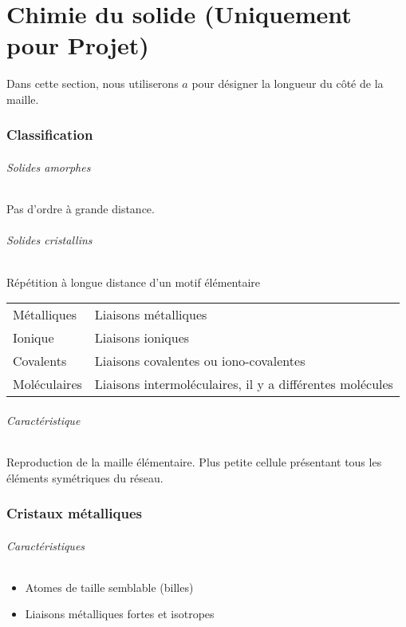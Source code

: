 \part{Chimie du solide (Uniquement pour Projet)}
Dans cette section,
nous utiliserons $a$ pour désigner la longueur du côté de la maille.

\section{Classification}

\paragraph{Solides amorphes}
Pas d'ordre à grande distance.

\paragraph{Solides cristallins}
Répétition à longue distance d'un motif élémentaire
\begin{center}
  \begin{tabular}{ll}
    Métalliques & Liaisons métalliques\\
    Ionique & Liaisons ioniques\\
    Covalents & Liaisons covalentes ou iono-covalentes\\
    Moléculaires & Liaisons intermoléculaires, il y a différentes molécules
  \end{tabular}
\end{center}

\paragraph{Caractéristique}
Reproduction de la maille élémentaire.
Plus petite cellule présentant tous les éléments symétriques du réseau.

\section{Cristaux métalliques}

\paragraph{Caractéristiques}
\begin{itemize}
  \item Atomes de taille semblable (billes)
  \item Liaisons métalliques fortes et isotropes
\end{itemize}

